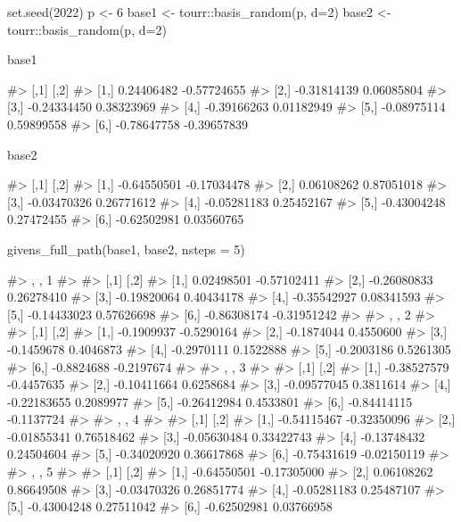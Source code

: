 \begin{Schunk}
\begin{Sinput}
set.seed(2022)
p <- 6
base1 <- tourr::basis_random(p, d=2)
base2 <- tourr::basis_random(p, d=2)

base1
\end{Sinput}
\begin{Soutput}
#>             [,1]        [,2]
#> [1,]  0.24406482 -0.57724655
#> [2,] -0.31814139  0.06085804
#> [3,] -0.24334450  0.38323969
#> [4,] -0.39166263  0.01182949
#> [5,] -0.08975114  0.59899558
#> [6,] -0.78647758 -0.39657839
\end{Soutput}
\begin{Sinput}
base2
\end{Sinput}
\begin{Soutput}
#>             [,1]        [,2]
#> [1,] -0.64550501 -0.17034478
#> [2,]  0.06108262  0.87051018
#> [3,] -0.03470326  0.26771612
#> [4,] -0.05281183  0.25452167
#> [5,] -0.43004248  0.27472455
#> [6,] -0.62502981  0.03560765
\end{Soutput}
\end{Schunk}

\begin{Schunk}
\begin{Sinput}
givens_full_path(base1, base2, nsteps = 5)
\end{Sinput}
\begin{Soutput}
#> , , 1
#> 
#>             [,1]        [,2]
#> [1,]  0.02498501 -0.57102411
#> [2,] -0.26080833  0.26278410
#> [3,] -0.19820064  0.40434178
#> [4,] -0.35542927  0.08341593
#> [5,] -0.14433023  0.57626698
#> [6,] -0.86308174 -0.31951242
#> 
#> , , 2
#> 
#>            [,1]       [,2]
#> [1,] -0.1909937 -0.5290164
#> [2,] -0.1874044  0.4550600
#> [3,] -0.1459678  0.4046873
#> [4,] -0.2970111  0.1522888
#> [5,] -0.2003186  0.5261305
#> [6,] -0.8824688 -0.2197674
#> 
#> , , 3
#> 
#>             [,1]       [,2]
#> [1,] -0.38527579 -0.4457635
#> [2,] -0.10411664  0.6258684
#> [3,] -0.09577045  0.3811614
#> [4,] -0.22183655  0.2089977
#> [5,] -0.26412984  0.4533801
#> [6,] -0.84414115 -0.1137724
#> 
#> , , 4
#> 
#>             [,1]        [,2]
#> [1,] -0.54115467 -0.32350096
#> [2,] -0.01855341  0.76518462
#> [3,] -0.05630484  0.33422743
#> [4,] -0.13748432  0.24504604
#> [5,] -0.34020920  0.36617868
#> [6,] -0.75431619 -0.02150119
#> 
#> , , 5
#> 
#>             [,1]        [,2]
#> [1,] -0.64550501 -0.17305000
#> [2,]  0.06108262  0.86649508
#> [3,] -0.03470326  0.26851774
#> [4,] -0.05281183  0.25487107
#> [5,] -0.43004248  0.27511042
#> [6,] -0.62502981  0.03766958
\end{Soutput}
\end{Schunk}

